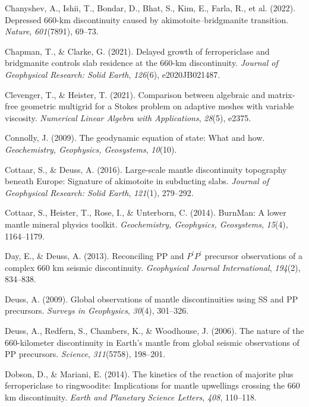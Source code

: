 \documentclass[draft,linenumbers]{agujournal2019}
\newlength{\cslhangindent}
\newenvironment{CSLReferences}[2]
 {\begin{list}{}{
  \setlength{\itemindent}{0pt}
  \setlength{\leftmargin}{0pt}
  \setlength{\parsep}{0pt}
  \ifodd #1
   \setlength{\leftmargin}{\cslhangindent}
   \setlength{\itemindent}{-\cslhangindent}
  \fi
  \setlength{\itemsep}{#2\baselineskip}
  }
  \item\relax}
 {\end{list}}
\begin{document}
\begin{CSLReferences}{1}{0}
{Chanyshev, A., Ishii, T., Bondar, D., Bhat, S., Kim, E., Farla, R., et
al.} (2022). Depressed 660-km discontinuity caused by
akimotoite--bridgmanite transition. \emph{Nature}, \emph{601}(7891),
69--73.

Chapman, T., \& Clarke, G. (2021). Delayed growth of ferropericlase and
bridgmanite controls slab residence at the 660-km discontinuity.
\emph{Journal of Geophysical Research: Solid Earth}, \emph{126}(6),
e2020JB021487.

Clevenger, T., \& Heister, T. (2021). Comparison between algebraic and
matrix-free geometric multigrid for a {Stokes} problem on adaptive
meshes with variable viscosity. \emph{Numerical Linear Algebra with
Applications}, \emph{28}(5), e2375.

Connolly, J. (2009). The geodynamic equation of state: What and how.
\emph{Geochemistry, Geophysics, Geosystems}, \emph{10}(10).

Cottaar, S., \& Deuss, A. (2016). Large-scale mantle discontinuity
topography beneath {Europe}: Signature of akimotoite in subducting
slabs. \emph{Journal of Geophysical Research: Solid Earth},
\emph{121}(1), 279--292.

Cottaar, S., Heister, T., Rose, I., \& Unterborn, C. (2014). {BurnMan}:
A lower mantle mineral physics toolkit. \emph{Geochemistry, Geophysics,
Geosystems}, \emph{15}(4), 1164--1179.

Day, E., \& Deuss, A. (2013). Reconciling {PP} and
{\(P^\prime P^\prime\)} precursor observations of a complex 660 km
seismic discontinuity. \emph{Geophysical Journal International},
\emph{194}(2), 834--838.

Deuss, A. (2009). Global observations of mantle discontinuities using
{SS} and {PP} precursors. \emph{Surveys in Geophysics}, \emph{30}(4),
301--326.

Deuss, A., Redfern, S., Chambers, K., \& Woodhouse, J. (2006). The
nature of the 660-kilometer discontinuity in {Earth}'s mantle from
global seismic observations of {PP} precursors. \emph{Science},
\emph{311}(5758), 198--201.

Dobson, D., \& Mariani, E. (2014). The kinetics of the reaction of
majorite plus ferropericlase to ringwoodite: Implications for mantle
upwellings crossing the 660 km discontinuity. \emph{Earth and Planetary
Science Letters}, \emph{408}, 110--118.


\end{CSLReferences}
\end{document}
